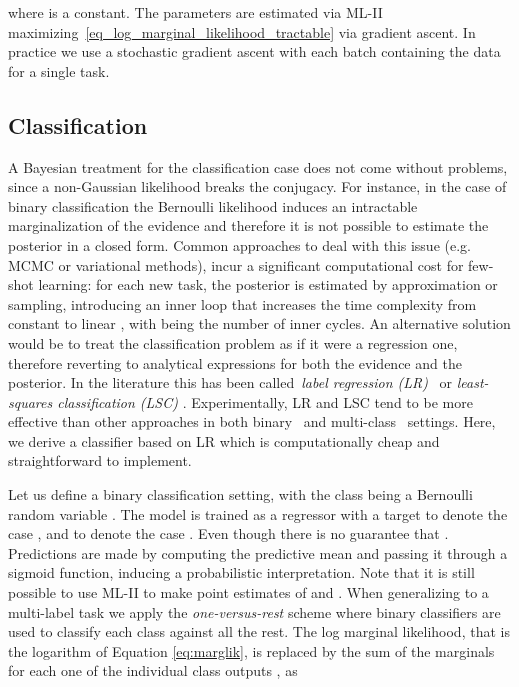 \documentclass{article}
\begin{document}
where  is a constant. The parameters are estimated via ML-II maximizing~\eqref{eq_log_marginal_likelihood_tractable} via gradient ascent. In practice we use a stochastic gradient ascent with each batch containing the data for a single task.

\subsection{Classification}

A Bayesian treatment for the classification case does not come without problems, since a non-Gaussian likelihood breaks the conjugacy. For instance, in the case of binary classification the Bernoulli likelihood induces an intractable marginalization of the evidence and therefore it is not possible to estimate the posterior in a closed form. Common approaches to deal with this issue (e.g. MCMC or variational methods), incur a significant computational cost for few-shot learning: for each new task, the posterior is estimated by approximation or sampling, introducing an inner loop that increases the time complexity from constant  to linear , with  being the number of inner cycles. An alternative solution would be to treat the classification problem as if it were a regression one, therefore reverting to analytical expressions for both the evidence and the posterior. In the literature this has been called~\emph{label regression (LR)}~\citep{kuss2006gaussian} or \emph{least-squares classification (LSC)} \citep{rifkin2004defense, rasmussen2006gaussian}. Experimentally, LR and LSC tend to be more effective than other approaches in both binary~\citep{kuss2006gaussian} and multi-class~\citep{rifkin2004defense} settings. Here, we derive a classifier based on LR which is computationally cheap and straightforward to implement.

Let us define a binary classification setting, with the class being a Bernoulli random variable . The model is trained as a regressor with a target  to denote the case , and  to denote the case . Even though  there is no guarantee that . Predictions are made by computing the predictive mean and passing it through a sigmoid function, inducing a probabilistic interpretation. Note that it is still possible to use ML-II to make point estimates of  and . When generalizing to a multi-label task we apply the \emph{one-versus-rest} scheme where  binary classifiers are used to classify each class against all the rest. The log marginal likelihood, that is the logarithm of Equation \eqref{eq:marglik}, is replaced by the sum of the marginals for each one of the  individual class outputs , as
\end{document}
